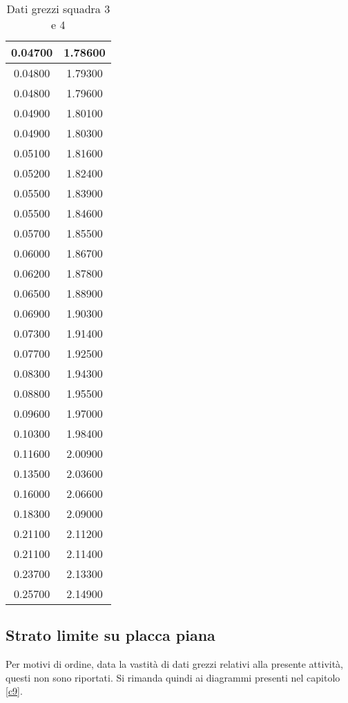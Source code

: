 \begin{table}[H]
\begin{tabular}{|c|c|}
    0.04700         & 1.78600      \\ \hline
    0.04800         & 1.79300      \\ \hline
    0.04800         & 1.79600      \\ \hline
    0.04900         & 1.80100      \\ \hline
    0.04900         & 1.80300      \\ \hline
    0.05100         & 1.81600      \\ \hline
    0.05200         & 1.82400      \\ \hline
    0.05500         & 1.83900      \\ \hline
    0.05500         & 1.84600      \\ \hline
    0.05700         & 1.85500      \\ \hline
    0.06000         & 1.86700      \\ \hline
    0.06200         & 1.87800      \\ \hline
    0.06500         & 1.88900      \\ \hline
    0.06900         & 1.90300      \\ \hline
    0.07300         & 1.91400      \\ \hline
    0.07700         & 1.92500      \\ \hline
    0.08300         & 1.94300      \\ \hline
    0.08800         & 1.95500      \\ \hline
    0.09600         & 1.97000      \\ \hline
    0.10300         & 1.98400      \\ \hline
    0.11600         & 2.00900      \\ \hline
    0.13500         & 2.03600      \\ \hline
    0.16000         & 2.06600      \\ \hline
    0.18300         & 2.09000      \\ \hline
    0.21100         & 2.11200      \\ \hline
    0.21100         & 2.11400      \\ \hline
    0.23700         & 2.13300      \\ \hline
    0.25700         & 2.14900      \\ \hline
    \end{tabular}
    \caption{Dati grezzi squadra 3 e 4}
\end{table}

\subsection{Strato limite su placca piana}\label{a9}
Per motivi di ordine, data la vastità di dati grezzi relativi alla presente attività, questi non sono riportati. Si rimanda quindi ai diagrammi presenti nel capitolo \ref{c9}.

